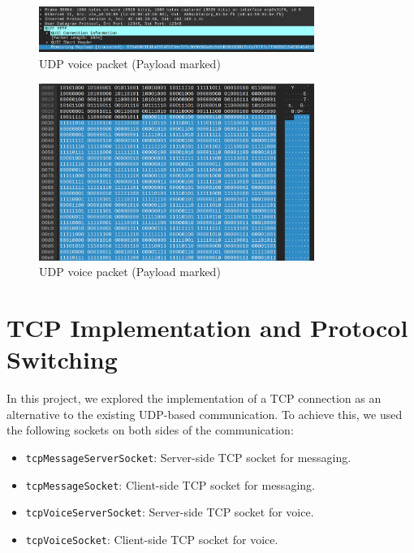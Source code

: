 \documentclass{article}
\begin{document}
\begin{figure}[h!]
    \centering
    \includegraphics[width=0.8\textwidth]{udp-voice-2.png}
    \caption{UDP voice packet (Payload marked)}
    \label{fig:udp-voice-2}
\end{figure}

\begin{figure}[h!]
    \centering
    \includegraphics[width=0.8\textwidth]{udp-voice-3.png}
    \caption{UDP voice packet (Payload marked)}
    \label{fig:udp-voice-3}
\end{figure}

\section{TCP Implementation and Protocol Switching}

In this project, we explored the implementation of a TCP connection as an alternative to the existing UDP-based communication. To achieve this, we used the following sockets on both sides of the communication:

\begin{itemize}
    \item \texttt{tcpMessageServerSocket}: Server-side TCP socket for messaging.
    \item \texttt{tcpMessageSocket}: Client-side TCP socket for messaging.
    \item \texttt{tcpVoiceServerSocket}: Server-side TCP socket for voice.
    \item \texttt{tcpVoiceSocket}: Client-side TCP socket for voice.
\end{itemize}
\end{document}

